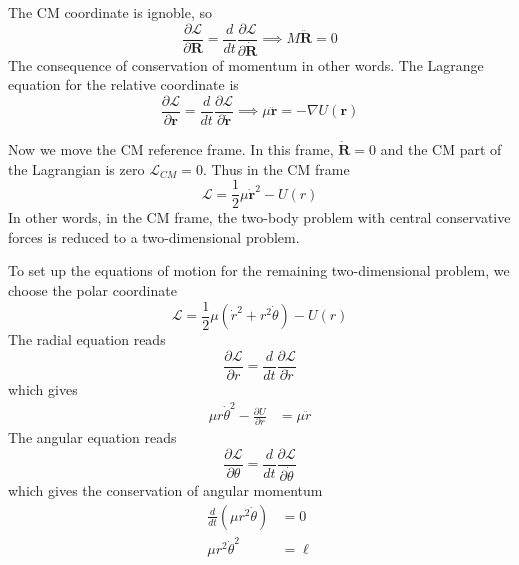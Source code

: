\documentclass[../../../main.tex]{subfiles}
\begin{document}
The CM coordinate is ignoble, so
\begin{equation*}
    \frac{\partial \mathcal{L }}{\partial \mathbf{R}}=\frac{d }{dt }\frac{\partial \mathcal{L }}{\partial \dot{\mathbf{R}}}
    \implies
    M \ddot{\mathbf{R}}=0
\end{equation*}
The consequence of conservation of momentum in other words.
The Lagrange equation for the relative coordinate is
\begin{equation*}
    \frac{\partial \mathcal{L }}{\partial \mathbf{r}}=\frac{d }{dt }\frac{\partial \mathcal{L }}{\partial \dot{\mathbf{r}}}
    \implies
    \mu \ddot{\mathbf{r}}=- \nabla U(\mathbf{r})
\end{equation*}

Now we move the CM reference frame.
In this frame, $\mathbf{\dot{R}} = 0$ and the CM part of the Lagrangian is zero $\mathcal{L}_{CM} = 0$.
Thus in the CM frame
\begin{equation*}
    \mathcal{L}=\frac{1 }{2 }\mu \mathbf{\dot{r}}^2-U(r)
\end{equation*}
In other words, in the CM frame, the two-body problem with central conservative forces is reduced to a two-dimensional problem.

To set up the equations of motion for the remaining two-dimensional problem, we  choose the polar coordinate
\begin{equation*}
    \mathcal{L}=\frac{1 }{2 }\mu \left( \dot{r}^2 +r^2\dot{\theta}\right) -U(r)
\end{equation*}
The radial equation reads
\begin{equation*}
    \frac{\partial \mathcal{L}}{\partial r} =\frac{d}{dt} \frac{\partial \mathcal{L}}{\partial \dot{r}}
\end{equation*}
which gives
\begin{align*}
    \mu r \dot{\theta}^2 - \frac{\partial U}{\partial r} & = \mu \ddot{r}
\end{align*}
The angular equation reads
\begin{equation*}
    \frac{\partial \mathcal{L}}{\partial \theta} =\frac{d}{dt} \frac{\partial \mathcal{L}}{\partial \dot{\theta}}
\end{equation*}
which gives the conservation of angular momentum
\begin{align*}
    \frac{d}{dt}(\mu r^2 \dot{\theta}) & =0    \\
    \mu r^2 \dot{\theta}^2             & =\ell
\end{align*}
\end{document}
